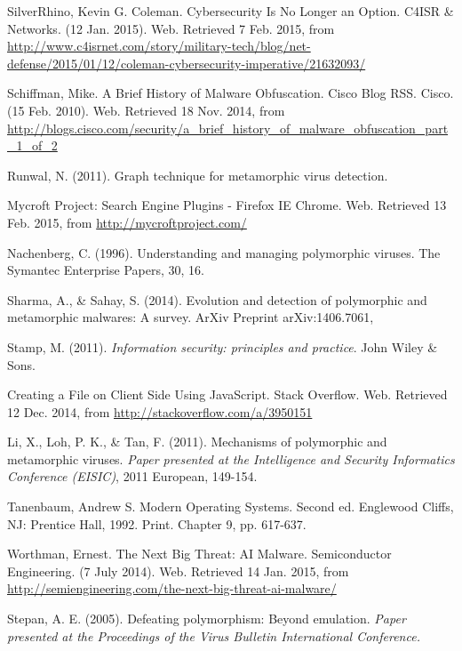 \begin{thebibliography}{10}
 SilverRhino, Kevin G. Coleman. Cybersecurity Is No Longer an Option. C4ISR \& Networks. (12 Jan. 2015). Web. Retrieved 7 Feb. 2015, from \\
\url{http://www.c4isrnet.com/story/military-tech/blog/net-defense/2015/01/12/coleman-cybersecurity-imperative/21632093/}

 Schiffman, Mike. A Brief History of Malware Obfuscation. Cisco Blog RSS. Cisco. (15 Feb. 2010). Web. Retrieved 18 Nov. 2014, from \\
\url{http://blogs.cisco.com/security/a_brief_history_of_malware_obfuscation_part_1_of_2 }

 Runwal, N. (2011). Graph technique for metamorphic virus detection.

 Mycroft Project: Search Engine Plugins - Firefox IE Chrome. Web. Retrieved 13 Feb. 2015, from \url{http://mycroftproject.com/}

 Nachenberg, C. (1996). Understanding and managing polymorphic viruses. The Symantec Enterprise Papers, 30, 16.

 Sharma, A., \& Sahay, S. (2014). Evolution and detection of polymorphic and metamorphic malwares: A survey. ArXiv Preprint arXiv:1406.7061,

 Stamp, M. (2011). {\it Information security: principles and practice}. John Wiley \& Sons.

 Creating a File on Client Side Using JavaScript. Stack Overflow. Web. Retrieved 12 Dec. 2014, from \url{http://stackoverflow.com/a/3950151}

 Li, X., Loh, P. K., \& Tan, F. (2011). Mechanisms of polymorphic and metamorphic viruses. {\it Paper presented at the Intelligence and Security Informatics Conference (EISIC)}, 2011 European, 149-154.

 Tanenbaum, Andrew S. Modern Operating Systems. Second ed. Englewood Cliffs, NJ: Prentice Hall, 1992. Print. Chapter 9, pp. 617-637.

 Worthman, Ernest. The Next Big Threat: AI Malware. Semiconductor Engineering. (7 July 2014). Web. Retrieved 14 Jan. 2015, from \\
\url{http://semiengineering.com/the-next-big-threat-ai-malware/}

 Stepan, A. E. (2005). Defeating polymorphism: Beyond emulation. {\it Paper presented at the Proceedings of the Virus Bulletin International Conference.}


\end{thebibliography}
